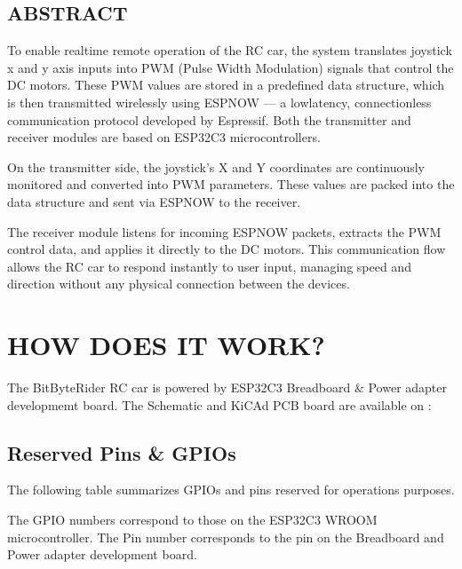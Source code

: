 \documentclass[letterpaper,10pt,english]{sphinxmanual}
\begin{document}
\section{ABSTRACT}
\label{\detokenize{intro:abstract}}
\sphinxAtStartPar
To enable real\sphinxhyphen{}time remote operation of the RC car, the system translates joystick x\sphinxhyphen{} and y\sphinxhyphen{} axis inputs into PWM (Pulse Width Modulation) signals that control the DC motors.
These PWM values are stored in a predefined data structure, which is then transmitted wirelessly using ESP\sphinxhyphen{}NOW — a low\sphinxhyphen{}latency, connectionless
communication protocol developed by Espressif. Both the transmitter and receiver modules are based on ESP32\sphinxhyphen{}C3 microcontrollers.

\sphinxAtStartPar
On the transmitter side, the joystick’s X and Y coordinates are continuously monitored and converted into PWM parameters. These values are packed into the
data structure and sent via ESP\sphinxhyphen{}NOW to the receiver.

\sphinxAtStartPar
The receiver module listens for incoming ESP\sphinxhyphen{}NOW packets, extracts the PWM control data, and applies it directly to the DC motors. This communication flow
allows the RC car to respond instantly to user input, managing speed and direction without any physical connection between the devices.

\sphinxstepscope


\chapter{HOW DOES IT WORK?}
\label{\detokenize{overview:how-does-it-work}}\label{\detokenize{overview::doc}}
\sphinxAtStartPar
The BitByteRider RC car is powered by ESP32\sphinxhyphen{}C3 Breadboard \& Power adapter developmemt board.
The Schematic and KiCAd PCB board are available on : 


\section{Reserved Pins \& GPIOs}
\label{\detokenize{overview:reserved-pins-gpios}}
\sphinxAtStartPar
The following table summarizes GPIOs and pins reserved for operations purposes.

\sphinxAtStartPar
The GPIO numbers correspond to those on the ESP32\sphinxhyphen{}C3 WROOM microcontroller. The Pin number corresponds to the pin on the Breadboard and Power adapter development board.
\end{document}
